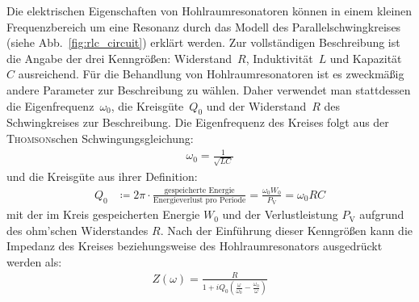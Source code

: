 Die elektrischen Eigenschaften von Hohlraumresonatoren können in einem kleinen Frequenzbereich um eine Resonanz durch das Modell des Parallelschwingkreises (siehe Abb.\ \ref{fig:rlc_circuit}) erklärt werden.
Zur vollständigen Beschreibung ist die Angabe der drei Kenngrößen: Widerstand~$R$, Induktivität~$L$ und Kapazität~$C$ ausreichend.
Für die Behandlung von Hohlraumresonatoren ist es zweckmäßig andere Parameter zur Beschreibung zu wählen.
Daher verwendet man stattdessen die Eigenfrequenz~$\omega_0$, die Kreisgüte~$Q_0$ und der Widerstand~$R$ des Schwingkreises zur Beschreibung.
Die Eigenfrequenz des Kreises folgt aus der \textsc{Thomson}schen Schwingungsgleichung:
\begin{align}
  \omega_0 = \frac{1}{\sqrt{L C}}
\end{align}
und die Kreisgüte aus ihrer Definition:
\begin{align}
  Q_0 &\coloneqq 2\pi \cdot \frac{\text{gespeicherte Energie}}{\text{Energieverlust pro Periode}} = \frac{\omega_0 W_0}{P_\mathrm{V}} = \omega_0 R C
  \label{eq:def_guete}
\end{align}
mit der im Kreis gespeicherten Energie $W_0$ und der Verlustleistung $P_\mathrm{V}$ aufgrund des ohm'schen Widerstandes $R$.
Nach der Einführung dieser Kenngrößen kann die Impedanz des Kreises beziehungsweise des Hohlraumresonators ausgedrückt werden als:
\begin{align}
  Z(\omega) = \frac{R}{1 + i Q_0 \left( \frac{\omega}{\omega_0}  - \frac{\omega_0}{\omega}\right)}
\end{align}

